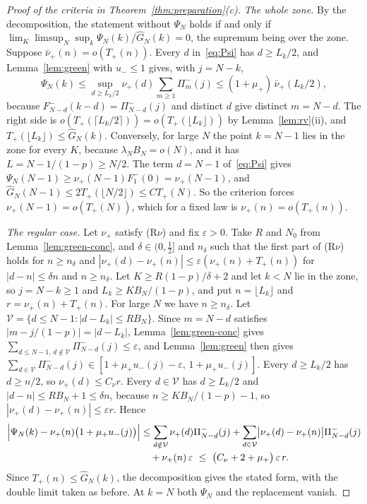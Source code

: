 \begin{proof}[Proof of the criteria in Theorem~\ref{thm:preparation}(c)]
\emph{The whole zone.} By the decomposition, the statement without $\Psi_N$ holds if
and only if $\lim_K\limsup_N\sup_k\Psi_N(k)/\widehat G_N(k)=0$, the supremum being over
the zone. Suppose $\bar\nu_\plus(n)=o(T_\plus(n))$. Every $d$ in~\eqref{eq:Psi} has
$d\ge L_k/2$, and Lemma~\ref{lem:green} with $u_\minus\le1$ gives, with $j=N-k$,
\begin{equation}\label{eq:Psi-upper}
 \Psi_N(k)\le\sup_{d\ge L_k/2}\nu_\plus(d)\sum_{m\ge1}\Pi^\minus_m(j)
 \le(1+\mu_\plus)\,\bar\nu_\plus(L_k/2),
\end{equation}
because $F^\minus_{N-d}(k-d)=\Pi^\minus_{N-d}(j)$ and distinct $d$ give distinct
$m=N-d$. The right side is $o(T_\plus(\lceil L_k/2\rceil))=o(T_\plus(\lfloor L_k\rfloor))$
by Lemma~\ref{lem:rv}(ii), and $T_\plus(\lfloor L_k\rfloor)\le\widehat G_N(k)$.
Conversely, for large $N$ the point $k=N-1$ lies in the zone for every $K$, because
$\lambda_NB_N=o(N)$, and it has $L=N-1/(1-p)\ge N/2$. The term $d=N-1$
of~\eqref{eq:Psi} gives $\Psi_N(N-1)\ge\nu_\plus(N-1)F^\minus_1(0)=\nu_\plus(N-1)$, and
$\widehat G_N(N-1)\le2T_\plus(\lfloor N/2\rfloor)\le CT_\plus(N)$. So the criterion
forces $\nu_\plus(N-1)=o(T_\plus(N))$, which for a fixed law is $\nu_\plus(n)=o(T_\plus(n))$.

\emph{The regular case.} Let $\nu_\plus$ satisfy (R$\nu$) and fix $\varepsilon>0$. Take $R$
and $N_0$ from Lemma~\ref{lem:green-conc}, and $\delta\in(0,\frac12]$ and $n_\delta$ such that the first
part of (R$\nu$) holds for $n\ge n_\delta$ and
$|\nu_\plus(d)-\nu_\plus(n)|\le\varepsilon(\nu_\plus(n)+T_\plus(n))$ for $|d-n|\le\delta n$ and
$n\ge n_\delta$. Let $K\ge R(1-p)/\delta+2$ and let $k<N$ lie in the zone, so $j=N-k\ge1$ and
$L_k\ge KB_N/(1-p)$, and put $n=\lfloor L_k\rfloor$ and $r=\nu_\plus(n)+T_\plus(n)$. For large $N$
we have $n\ge n_\delta$. Let $\mathcal V=\{d\le N-1:|d-L_k|\le RB_N\}$. Since $m=N-d$ satisfies
$|m-j/(1-p)|=|d-L_k|$, Lemma~\ref{lem:green-conc} gives
$\sum_{d\le N-1,\,d\notin\mathcal V}\Pi^\minus_{N-d}(j)\le\varepsilon$, and Lemma~\ref{lem:green}
then gives $\sum_{d\in\mathcal V}\Pi^\minus_{N-d}(j)\in[1+\mu_\plus u_\minus(j)-\varepsilon,\,1+\mu_\plus u_\minus(j)]$.
Every $d\ge L_k/2$ has $d\ge n/2$, so $\nu_\plus(d)\le C_\nu r$. Every $d\in\mathcal V$
has $d\ge L_k/2$ and $|d-n|\le RB_N+1\le\delta n$, because $n\ge KB_N/(1-p)-1$, so
$|\nu_\plus(d)-\nu_\plus(n)|\le\varepsilon r$. Hence
\begin{align*}
 \Bigl|\Psi_N(k)-\nu_{+}(n)\bigl(1+\mu_{+} u_{-}(j)\bigr)\Bigr|
 &\le\sum_{d\notin\mathcal V}\nu_{+}(d)\Pi^{-}_{N-d}(j)
 +\sum_{d\in\mathcal V}\bigl|\nu_{+}(d)-\nu_{+}(n)\bigr|\Pi^{-}_{N-d}(j)\\
 &\quad+\nu_{+}(n)\,\varepsilon
 \ \le\ \bigl(C_\nu+2+\mu_{+}\bigr)\,\varepsilon\,r .
\end{align*}
Since $T_\plus(n)\le\widehat G_N(k)$, the decomposition gives the stated form, with the
double limit taken as before. At $k=N$ both $\Psi_N$ and the replacement vanish.
\end{proof}

